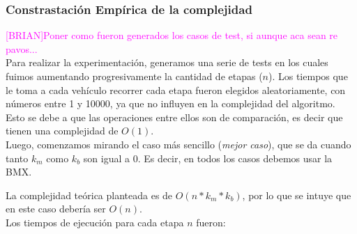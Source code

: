 \subsubsection{Constrastaci\'on Emp\'irica de la complejidad}

\textcolor{magenta}{[BRIAN]Poner como fueron generados los casos de test, si aunque aca sean re pavos...}\\

Para realizar la experimentaci\'on, generamos una serie de tests en los cuales fuimos aumentando progresivamente la cantidad de etapas ($n$).
Los tiempos que le toma a cada veh\'iculo recorrer cada etapa fueron elegidos aleatoriamente, con n\'umeros entre 1 y 10000, ya que no influyen en la complejidad del algoritmo. 
Esto se debe a que las operaciones entre ellos son de comparaci\'on, es decir que tienen una complejidad de $O(1)$.\\

Luego, comenzamos mirando el caso m\'as sencillo (\emph{mejor caso}), que se da cuando tanto $k_m$ como $k_b$ son igual a 0. Es decir, en todos los casos debemos usar la BMX. 
  
  La complejidad te\'orica planteada es de $O(n * k_m * k_b)$, por lo que se intuye que en este caso deber\'ia ser $O(n)$.\\
  
  Los tiempos de ejecuci\'on para cada etapa $n$ fueron:
  
